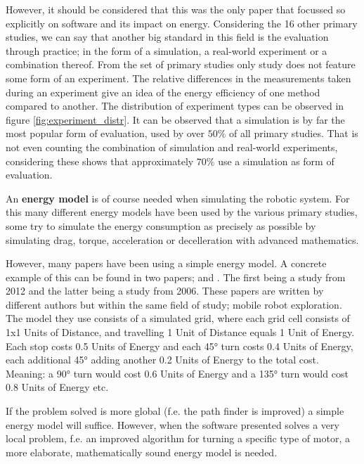 However, it should be considered that this was the only paper that focussed so explicitly on software and its impact on energy.
Considering the 16 other primary studies, we can say that another big standard in this field is the evaluation through practice; 
in the form of a simulation, a real-world experiment or a combination thereof.
From the set of primary studies only study \cite{barili1995efficient_motion} does not feature some form of an experiment.
The relative differences in the measurements taken during an experiment give an idea of the energy efficiency of one method compared to another.
The distribution of experiment types can be observed in figure \ref{fig:experiment_distr}.
It can be observed that a simulation is by far the most popular form of evaluation, used by over $50\%$ of all primary studies.
That is not even counting the combination of simulation and real-world experiments, considering these shows that approximately $70\%$ use 
a simulation as form of evaluation.

An \textbf{energy model} is of course needed when simulating the robotic system. 
For this many different energy models have been used by the various primary studies, some try to simulate the energy consumption 
as precisely as possible by simulating drag, torque, acceleration or decelleration with advanced mathematics.

However, many papers have been using a simple energy model.
A concrete example of this can be found in two papers; \cite{patel2012exploration_strategy} and \cite{mei2006mobile_exploration}. 
The first being a study from 2012 and the latter being a study from 2006. 
These papers are written by different authors but within the same field of study; mobile robot exploration.
The model they use consists of a simulated grid, where each grid cell consists of 1x1 Units of Distance, 
and travelling 1 Unit of Distance equals 1 Unit of Energy.
Each stop costs 0.5 Units of Energy and each 45° turn costs 0.4 Units of Energy, each additional 45° adding another 
0.2 Units of Energy to the total cost.
Meaning: a 90° turn would cost 0.6 Units of Energy and a 135° turn would cost 0.8 Units of Energy etc.

If the problem solved is more global (f.e. the path finder is improved) a simple energy model will suffice.
However, when the software presented solves a very local problem, f.e. an improved algorithm for turning a specific type of motor,
a more elaborate, mathematically sound energy model is needed.

\vspace{5mm}

